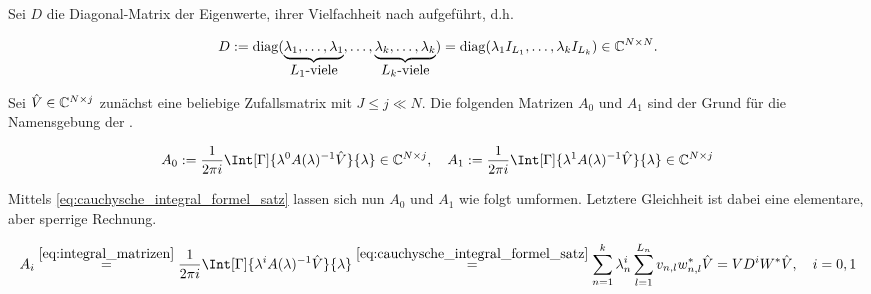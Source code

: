 Sei $D$ die Diagonal-Matrix der Eigenwerte, ihrer Vielfachheit nach aufgeführt, d.h.

\begin{align} \label{eq:diagonal_matrix}
    D
    :=
    \operatorname{diag}
    (
        \underbrace
        {
            \lambda_1, \dots, \lambda_1
        }_{
            \displaystyle
            \text{$L_1$-viele}
        },
        \dots,
        \underbrace
        {
            \lambda_k, \dots, \lambda_k
        }_{
            \displaystyle
            \text{$L_k$-viele}
        }
    )
    =
    \operatorname{diag}(\lambda_1 I_{L_1}, \dots, \lambda_k I_{L_k})
    \in
    \mathbb{C}^{N \times N}.
\end{align}

Sei $\hat V \in \mathbb{C}^{N \times j}$ zunächst eine beliebige Zufallsmatrix mit $J \leq j \ll N$.
Die folgenden Matrizen $A_0$ und $A_1$ sind der Grund für die Namensgebung der .

\begin{align} \label{eq:integral_matrizen}
    A_0 := \frac{1}{2 \pi i} \Int[\Gamma]{\lambda^0 A(\lambda)^{-1} \hat V}{\lambda} \in \C^{N \times j},
    \quad
    A_1 := \frac{1}{2 \pi i} \Int[\Gamma]{\lambda^1 A(\lambda)^{-1} \hat V}{\lambda} \in \C^{N \times j}
\end{align}

Mittels \eqref{eq:cauchysche_integral_formel_satz} lassen sich nun $A_0$ und $A_1$ wie folgt umformen.
Letztere Gleichheit ist dabei eine elementare, aber sperrige Rechnung.

\begin{align} \label{eq:integral_matrizen_resultat_compact}
    A_i
    \stackrel
    {
        \eqref{eq:integral_matrizen}
    }{=}
    \frac{1}{2 \pi i}
    \Int[\Gamma]
    {
        \lambda^i
        A(\lambda)^{-1}
        \hat V
    }{\lambda}
    \stackrel
    {
        \eqref{eq:cauchysche_integral_formel_satz}
    }{=}
    \sum_{n=1}^k
        \lambda_n^i
        \sum_{l=1}^{L_n}
            v_{n, l} w_{n, l}^\ast
    \hat V
    =
    V D^i W^\ast \hat V,
    \quad
    i = 0, 1
\end{align}
